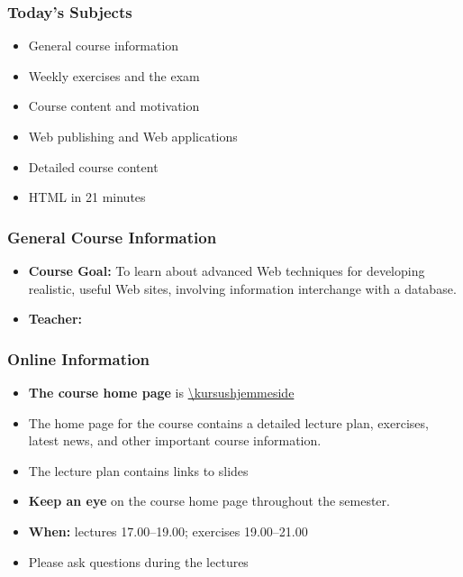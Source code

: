 \documentclass[dvipsnames]{beamer}
\begin{document}
\begin{frame}
  \titlepage{}
\end{frame}


\begin{frame}

\frametitle{Today's Subjects}

\begin{itemize}
\item General course information
\item Weekly exercises and the exam
\item Course content and motivation
\item Web publishing and Web applications
\item Detailed course content
\item HTML in 21 minutes
\end{itemize}
\end{frame}


\begin{frame}
\frametitle{General Course Information}

\begin{itemize}
\item \textbf{Course Goal:} To learn about advanced Web techniques for
  developing realistic, useful Web sites, involving information
  interchange with a database.

\item \textbf{Teacher:} \undervisernavne{}
\end{itemize}
\end{frame}


\begin{frame}
  \frametitle{Online Information}
  \begin{itemize}
  \item \textbf{The course home page} is \url{\kursushjemmeside}
  \item The home page for the course contains a detailed lecture plan,
    exercises, latest news, and other important course information.
  \item The lecture plan contains links to slides
  \item \textbf{Keep an eye} on the course home page throughout the
    semester.
  \item \textbf{When:} lectures \kursusugedag{} 17.00--19.00; exercises
    19.00--21.00
  \item Please ask questions during the lectures
  \end{itemize}
\end{frame}
\end{document}
